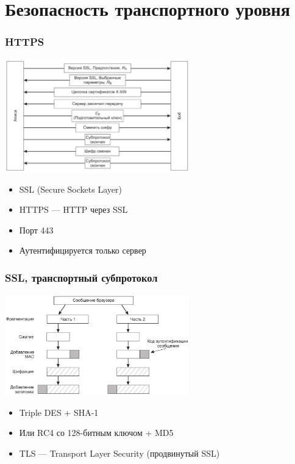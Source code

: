 \documentclass{../cscslides}
\begin{document}
    \section{Безопасность транспортного уровня}

    \begin{frame}
        \frametitle{HTTPS}
        \begin{center}
            \includegraphics[width=0.6\textwidth]{ssl.png}
        \end{center}
        \begin{itemize}
            \item SSL (Secure Sockets Layer)
            \item HTTPS --- HTTP через SSL
            \item Порт 443
            \item Аутентифицируется только сервер
        \end{itemize}
    \end{frame}

    \begin{frame}
        \frametitle{SSL, транспортный субпротокол}
        \begin{center}
            \includegraphics[width=0.6\textwidth]{sslCommunication.png}
        \end{center}
        \begin{itemize}
            \item Triple DES + SHA-1
            \item Или RC4 со 128-битным ключом + MD5
            \item TLS --- Transport Layer Security (продвинутый SSL)
        \end{itemize}
    \end{frame}
\end{document}
